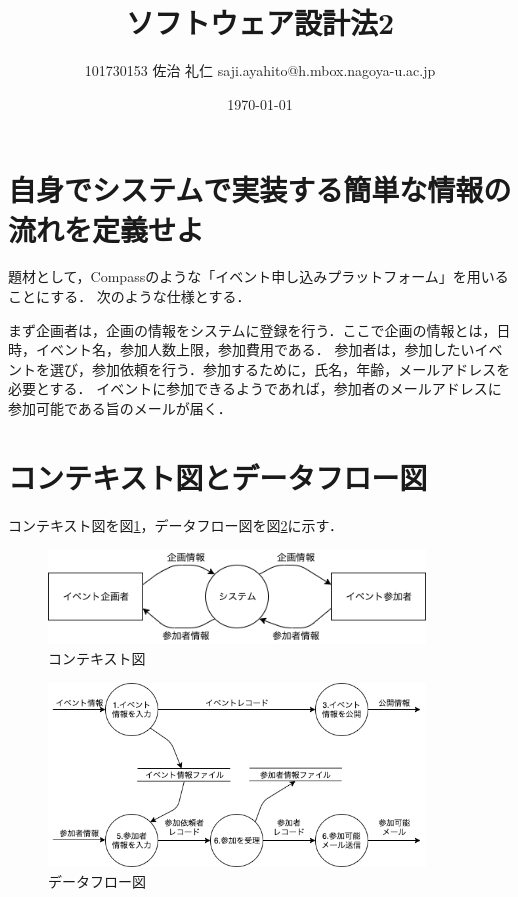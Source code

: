 \documentclass[uplatex]{jsarticle}
\title{ソフトウェア設計法2}
\author{101730153 佐治 礼仁 saji.ayahito@h.mbox.nagoya-u.ac.jp}
\date{\today}
\begin{document}
\maketitle
\section{自身でシステムで実装する簡単な情報の流れを定義せよ}
題材として，Compassのような「イベント申し込みプラットフォーム」を用いることにする．
次のような仕様とする．

まず企画者は，企画の情報をシステムに登録を行う．ここで企画の情報とは，日時，イベント名，参加人数上限，参加費用である．
参加者は，参加したいイベントを選び，参加依頼を行う．参加するために，氏名，年齢，メールアドレスを必要とする．
イベントに参加できるようであれば，参加者のメールアドレスに参加可能である旨のメールが届く．

\section{コンテキスト図とデータフロー図}
コンテキスト図を図\ref{fig:context-diagram}，データフロー図を図\ref{fig:dataflow-diagram}に示す．

\begin{figure}[htbp]
  \begin{center}
    \includegraphics[clip,width=10.0cm]{figures/context-diagram.png}
    \caption{コンテキスト図}
    \label{fig:context-diagram}
  \end{center}
\end{figure}


\begin{figure}[htbp]
  \begin{center}
    \includegraphics[clip,width=10.0cm]{figures/dataflow-diagram.png}
    \caption{データフロー図}
    \label{fig:dataflow-diagram}
  \end{center}
\end{figure}
\end{document}
